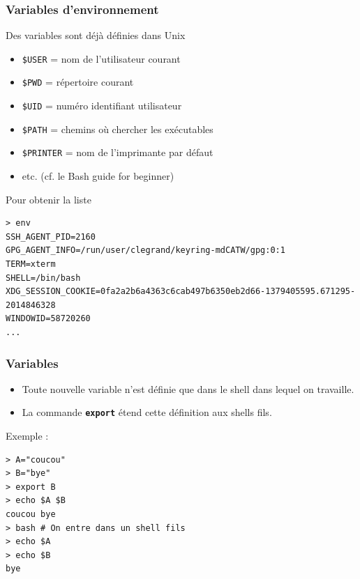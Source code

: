 \documentclass{beamer}
\newenvironment{terminal}{\color{white}\begin{snugshade*}}
{\end{snugshade*}\color{black}}
\begin{document}
\begin{frame}[fragile]
\frametitle{Variables d'environnement}
Des variables sont déjà définies dans Unix
\begin{itemize}
\item \verb|$USER| = nom de l'utilisateur courant
\item \verb|$PWD| = répertoire courant
\item \verb|$UID| =  numéro identifiant utilisateur
\item \verb|$PATH| =  chemins où chercher les exécutables
\item \verb|$PRINTER| =  nom de l'imprimante par défaut
\item etc. (cf. le Bash guide for beginner)
\end{itemize}
Pour obtenir la liste
\begin{terminal}
\begin{scriptsize}
\begin{verbatim}
> env
SSH_AGENT_PID=2160
GPG_AGENT_INFO=/run/user/clegrand/keyring-mdCATW/gpg:0:1
TERM=xterm
SHELL=/bin/bash
XDG_SESSION_COOKIE=0fa2a2b6a4363c6cab497b6350eb2d66-1379405595.671295-2014846328
WINDOWID=58720260
...
\end{verbatim}
\end{scriptsize}
\end{terminal}
\end{frame}

\begin{frame}[fragile]
\frametitle{Variables}
\begin{itemize}
\item Toute nouvelle variable n'est définie que dans le shell dans lequel on travaille.
\item La commande \texttt{\bf export} étend cette définition aux shells fils.
\end{itemize}
{\color{blue} Exemple :}
\begin{terminal}
\begin{verbatim}
> A="coucou"
> B="bye"
> export B
> echo $A $B
coucou bye
> bash # On entre dans un shell fils
> echo $A
> echo $B
bye
\end{verbatim}
\end{terminal}
\end{frame}
\end{document}
